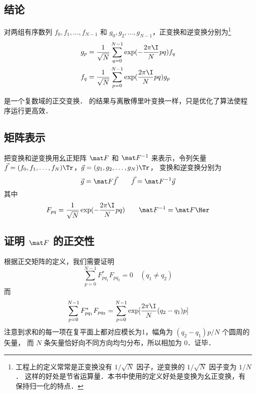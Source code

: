 
\subsection{结论}

对两组有序数列 $f_0,f_1,\dots,f_{N-1}$ 和 $g_0,g_2,\dots, g_{N-1}$，正变换和逆变换分别为\footnote{工程上的定义常常是正变换没有 $1/\sqrt{N}$ 因子，逆变换的 $1/\sqrt{N}$ 因子变为 $1/N$． 这样的好处是节省运算量．本书中使用的定义好处是变换为幺正变换，有保持归一化的特点．}
\begin{align}
g_p &= \frac{1}{\sqrt{N}}\sum_{q=0}^{N-1} \exp(-\frac{2\pi\I}{N} p q ) f_q \\
f_q &= \frac{1}{\sqrt{N}}\sum_{p=0}^{N-1} \exp(\frac{2\pi\I}{N} p q) g_p
\end{align}

是一个复数域的正交变换．%
的结果与离散傅里叶变换一样，只是优化了算法使程序运行更高效．

\subsection{矩阵表示}
把变换和逆变换用幺正矩阵 $\mat F$ 和 $\mat F^{-1}$ 来表示，令列矢量 $\vec f = (f_0,f_1,\dots,f_N)\Tr$，$\vec g = (g_1,g_2,\dots,g_N)\Tr$， 变换和逆变换分别为
\begin{equation}
\vec g = \mat F \vec f \qquad
\vec f = \mat F^{-1} \vec g
\end{equation}
其中
\begin{equation}
F_{pq} = \frac{1}{\sqrt{N}} \exp(-\frac{2\pi\I}{N} p q) \qquad
\mat F^{-1} = \mat F\Her
\end{equation}

\subsection{证明 $\mat F$ 的正交性}
根据正交矩阵的定义，我们需要证明
\begin{equation}
\sum_{p=0}^{N-1} F^*_{pq_1} F_{pq_2} = 0 \quad (q_1 \ne q_2)
\end{equation}
而
\begin{equation}\label{DFT_eq1}
\sum_{p=0}^{N-1} F^*_{pq_1}F_{pq_2}
= \sum_{p=0}^{N-1} \exp[\frac{2\pi\I}{N} (q_2-q_1) p]
\end{equation}
注意到求和的每一项在复平面上都对应模长为1，幅角为 $(q_2-q_1)p/N$ 个圆周的矢量，%
而 $N$ 条矢量恰好向不同方向均匀分布，所以相加为 $0$．证毕．

